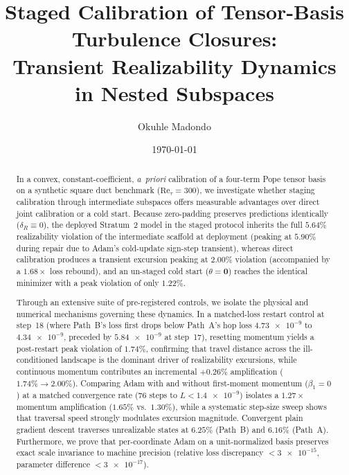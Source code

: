 \documentclass[preprint,aps,prb,longbibliography,superscriptaddress]{revtex4-2}
\begin{document}
\title{Staged Calibration of Tensor-Basis Turbulence Closures:\\
Transient Realizability Dynamics in Nested Subspaces}

\author{Okuhle Madondo}

\date{\today}

\begin{abstract}
In a convex, constant-coefficient, \emph{a~priori} calibration of a four-term
Pope tensor basis on a synthetic square duct benchmark ($\mathrm{Re}_\tau = 300$),
we investigate whether staging calibration through intermediate subspaces
offers measurable advantages over direct joint calibration or a cold start.
Because zero-padding preserves predictions identically ($\delta_R \equiv 0$),
the deployed Stratum~2 model in the staged protocol inherits the full $5.64\%$
realizability violation of the intermediate scaffold at deployment (peaking at
$5.90\%$ during repair due to Adam's cold-update sign-step transient), whereas direct
calibration produces a transient excursion peaking at $2.00\%$ violation
(accompanied by a $1.68\times$ loss rebound), and an un-staged cold start
($\theta = \mathbf{0}$) reaches the identical minimizer with a peak violation of
only $1.22\%$.

Through an extensive suite of pre-registered controls, we isolate the physical
and numerical mechanisms governing these dynamics. In a matched-loss restart control
at step~18 (where Path~B's loss first drops below Path~A's hop loss $\num{4.73e-9}$
to $\num{4.34e-9}$, preceded by $\num{5.84e-9}$ at step~17), resetting momentum yields a post-restart peak violation of
$1.74\%$, confirming that travel distance across
the ill-conditioned landscape is the dominant driver of realizability excursions,
while continuous momentum contributes an incremental $+0.26\%$ amplification ($1.74\% \to 2.00\%$).
Comparing Adam with and without first-moment momentum ($\beta_1 = 0$) at a matched
convergence rate ($76$ steps to $L < \num{1.4e-9}$) isolates a $1.27\times$
momentum amplification ($1.65\%$ vs.\ $1.30\%$), while a systematic step-size sweep
shows that traversal speed strongly modulates excursion magnitude. Convergent plain
gradient descent traverses unrealizable states at $6.25\%$ (Path~B) and $6.16\%$
(Path~A). Furthermore, we prove that per-coordinate Adam on a unit-normalized basis
preserves exact scale invariance to machine precision (relative loss discrepancy
$< \num{3e-15}$, parameter difference $< \num{3e-17}$).


\end{abstract}
\end{document}

